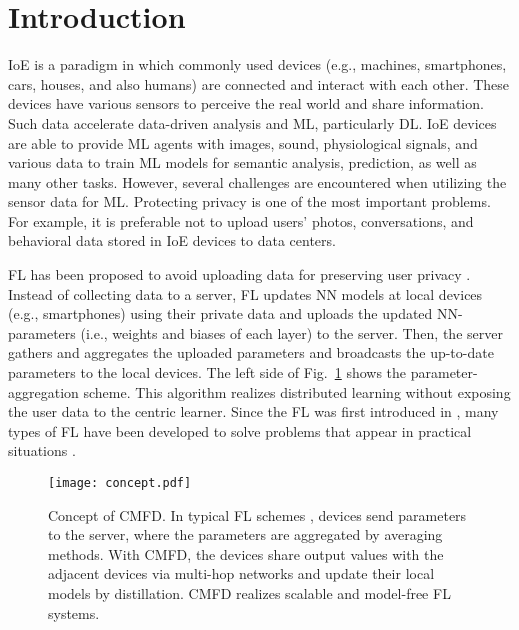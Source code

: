 \documentclass[journal]{IEEEtran}
\begin{document}
\glsresetall

\section{Introduction} \label{sec:intro}
 \gls{IoE}
is a paradigm in which commonly used devices (e.g., machines, smartphones, cars, houses, and also humans)
are connected and interact with each other.
These devices have various sensors to perceive the real world and share information.
Such data accelerate data-driven analysis and \gls{ML}, particularly \gls{DL}.
\Gls{IoE} devices are able to provide \gls{ML} agents with images, sound, physiological signals, and various data to train \gls{ML} models
for semantic analysis, prediction, as well as many other tasks.
However, several challenges are encountered when utilizing the sensor data for \gls{ML}.
Protecting privacy is one of the most important problems.
For example, it is preferable not to upload users’ photos, conversations, and behavioral data stored in \gls{IoE} devices to data centers.

\Gls{FL} has been proposed to avoid uploading data for preserving user privacy \cite{mcmahan2016communication,kairouz2019advances}.
Instead of collecting data to a server,
\Gls{FL} updates \gls{NN} models at local devices (e.g., smartphones) using their private data
and uploads the updated \gls{NN}-parameters (i.e., weights and biases of each layer) to the server.
Then, the server gathers and aggregates the uploaded parameters
and broadcasts the up-to-date parameters to the local devices.
The left side of Fig.~\ref{fig:concept} shows the parameter-aggregation scheme.
This algorithm realizes distributed learning without exposing the user data to the centric learner.
Since the \gls{FL} was first introduced in \cite{mcmahan2016communication},
many types of \gls{FL} have been developed to solve problems that appear in practical situations \cite{kairouz2019advances}.

\begin{figure}[!t]
\centering
\texttt{[image: concept.pdf]}
\caption{
Concept of \gls{CMFD}.
In typical \gls{FL} schemes \cite{mcmahan2016communication}, devices send parameters to the server, where the parameters are aggregated by averaging methods.
With \gls{CMFD}, the devices share output values with the adjacent devices via multi-hop networks
and update their local models by distillation.
\Gls{CMFD} realizes scalable and model-free \gls{FL} systems.
}
\label{fig:concept}
\end{figure}
\end{document}
